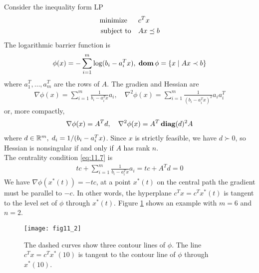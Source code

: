 \begin{example}
  Consider the inequality form LP
  \begin{align}
    \text{minimize\;\;}\quad& c^Tx\nonumber\\
    \text{subject to}  \quad& Ax\preceq b\label{eq:11.8}
  \end{align}
  The logarithmic barrier function is
  \begin{align*}
    \phi(x)=-\sum_{i=1}^m\log(b_i-a_i^Tx),\;\mathop{\bf dom}\phi=\{x\mid Ax\prec b\}
  \end{align*}
  where $a_1^T,\dots,a_m^T$ are the rows of $A$. The gradien and Hessian are
  \begin{align*}
    \nabla\phi(x)=\sum_{i=1}^m\frac{1}{b_i-a_i^Tx}a_i,\quad\nabla^2\phi(x)=\sum_{i=1}^m\frac{1}{(b_i-a_i^Tx)^2}a_ia_i^T
  \end{align*}
  or, more compactly,
  \begin{align*}
    \nabla\phi(x)=A^Td,\quad\nabla^2\phi(x)=A^T\mathop{\bf diag}(d)^2A
  \end{align*}
  where $d\in\mathbb{R}^m,\;d_i=1/(b_i-a_i^Tx)$.
  Since $x$ is strictly feasible, we have $d\succ 0$, so Hessian is nonsingular if and only if $A$ has rank $n$.\\
  The centrality condition \eqref{eq:11.7} is
  \begin{align}
    tc+\sum_{i=1}^m\frac{1}{b_i-a_i^Tx}a_i=tc+A^Td=0\label{eq:11.9}
  \end{align}
  We have $\nabla\phi(x^\ast(t))=-tc$, \ie at a point $x^\ast(t)$ on the central path the gradient must be parallel to $-c$.
  In other words, the hyperplane $c^Tx=c^Tx^\ast(t)$ is tangent to the level set of $\phi$ through $x^\ast(t)$.
  Figure \ref{fig:11.2} shows an example with $m=6$ and $n=2$.
\end{example}
\begin{figure}
  \centering
  \texttt{[image: fig11\_2]}
  \caption{The dashed curves show three contour lines of $\phi$. The line $c^Tx=c^Tx^\ast(10)$ is tangent to the contour line of $\phi$ through $x^\ast(10)$.}
  \label{fig:11.2}
\end{figure}


